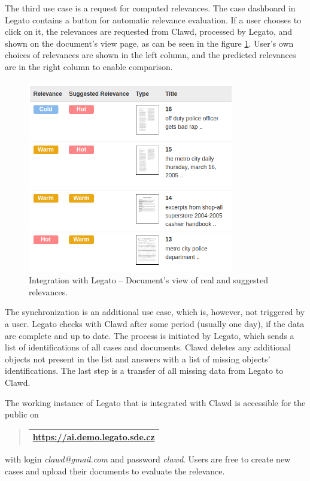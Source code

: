 \documentclass[
  digital, %
  notable,   %
  nolof,     %
  nolot,     %
]{fithesis3}
\begin{document}
The third use case is a request for computed relevances.
The case dashboard in Legato contains a button for automatic relevance evaluation.
If a user chooses to click on it, the relevances are requested from Clawd, processed by Legato, and shown on the document's view page, as can be seen in the figure \ref{fig:integration_documentsview}.
User's own choices of relevances are shown in the left column, and the predicted relevances are in the right column to enable comparison.

\begin{figure}[h]
\caption{Integration with Legato -- Document's view of real and suggested relevances.}
\label{fig:integration_documentsview}
\includegraphics[width=0.8\textwidth]{img/integration_documentsview}
\end{figure}

The synchronization is an additional use case, which is, however, not triggered by a user.
Legato checks with Clawd after some period (usually one day), if the data are complete and up to date.
The process is initiated by Legato, which sends a list of identifications of all cases and documents.
Clawd deletes any additional objects not present in the list and answers with a list of missing objects' identifications.
The last step is a transfer of all missing data from Legato to Clawd.

\newpage
The working instance of Legato that is integrated with Clawd is accessible for the public on 
\begin{quote}
\begin{tabularx}{10.45cm}{|>{\centering\arraybackslash} m{10cm}|}
\hline
\vspace{2mm}
\url{https://ai.demo.legato.sde.cz}
\vspace{2mm} \\
\hline
\end{tabularx}
\end{quote}
with login \textit{clawd@gmail.com} and password \textit{clawd}.
Users are free to create new cases and upload their documents to evaluate the relevance.
\end{document}

